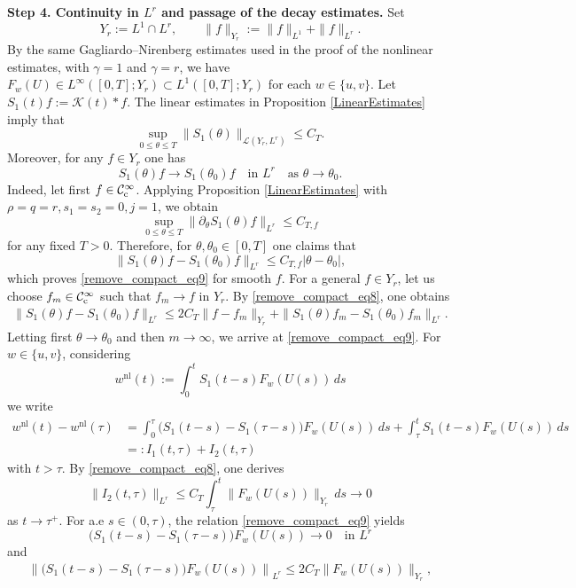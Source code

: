 \documentclass[11pt,reqno]{amsart}
\begin{document}
	\noindent
	\textbf{Step 4. Continuity in $L^r$ and passage of the decay estimates.}
	Set
	\[
	Y_r:=L^1\cap L^r,\qquad\|f\|_{Y_r}:=\|f\|_{L^1}+\|f\|_{L^r}.
	\]
	By the same Gagliardo--Nirenberg estimates used in the proof of the nonlinear estimates, with $\gamma=1$ and $\gamma=r$, we have $F_w(U)\in L^\infty([0,T];Y_r)\subset L^1([0,T];Y_r)$ for each $w\in\{u,v\}$. Let $S_1(t)f:=\mathcal{K}(t)*f$. The linear estimates in Proposition \ref{LinearEstimates} imply that
	\begin{equation}\label{remove_compact_eq8}
		\sup_{0\leq \theta\leq T}\|S_1(\theta)\|_{\mathcal L(Y_r,L^r)}\leq C_T.
	\end{equation}
	Moreover, for any $f\in Y_r$ one has
	\begin{equation}\label{remove_compact_eq9}
		S_1(\theta)f\to S_1(\theta_0)f\quad\text{in }L^r\quad\text{as }\theta\to \theta_0.
	\end{equation}
	Indeed, let first $f\in \mathcal{C}^\infty_{\rm c}$. Applying Proposition \ref{LinearEstimates} with $\rho=q=r,s_1=s_2=0,j=1$, we obtain
	\[
	\sup_{0\leq \theta\leq T}\|\partial_\theta S_1(\theta)f\|_{L^r}
	\le C_{T,f}
	\]
	for any fixed $T>0$. Therefore, for $\theta,\theta_0\in[0,T]$ one claims that
	\[
	\|S_1(\theta)f-S_1(\theta_0)f\|_{L^r}\leq C_{T,f}|\theta-\theta_0|,
	\]
	which proves \eqref{remove_compact_eq9} for smooth $f$. For a general $f\in Y_r$, let us choose $f_m\in \mathcal{C}^\infty_{\rm c}$ such that $f_m\to f$ in $Y_r$. By \eqref{remove_compact_eq8}, one obtains
	\[
	\begin{aligned}
		\|S_1(\theta)f-S_1(\theta_0)f\|_{L^r}\leq 2C_T\|f-f_m\|_{Y_r}+\|S_1(\theta)f_m-S_1(\theta_0)f_m\|_{L^r}.
	\end{aligned}
	\]
	Letting first $\theta\to \theta_0$ and then $m\to\infty$, we arrive at \eqref{remove_compact_eq9}. For $w\in\{u,v\}$, considering
	\[
	w^{\mathrm{nl}}(t):=\int_0^tS_1(t-s)F_w(U(s))\,ds
	\]
	we write
	\[
	\begin{aligned}
		w^{\mathrm{nl}}(t)-w^{\mathrm{nl}}(\tau)&=\int_0^\tau \bigl(S_1(t-s)-S_1(\tau-s)\bigr)F_w(U(s))\,ds+\int_\tau^t S_1(t-s)F_w(U(s))\,ds\\
		&=:I_1(t,\tau)+I_2(t,\tau)
	\end{aligned}
	\]
	with $t>\tau$. By \eqref{remove_compact_eq8}, one derives
	\[
	\|I_2(t,\tau)\|_{L^r}\leq C_T\int_\tau^t \|F_w(U(s))\|_{Y_r}\,ds\to 0
	\]
	as $t\to\tau^+$. For a.e $s\in(0,\tau)$, the relation \eqref{remove_compact_eq9} yields
	\[
	\bigl(S_1(t-s)-S_1(\tau-s)\bigr)F_w(U(s))\to 0 \quad\text{in }L^r
	\]
	and
	\[
	\begin{aligned}
		\left\|\bigl(S_1(t-s)-S_1(\tau-s)\bigr)F_w(U(s))\right\|_{L^r}\leq 2C_T\|F_w(U(s))\|_{Y_r},
	\end{aligned}
	\]
\end{document}

